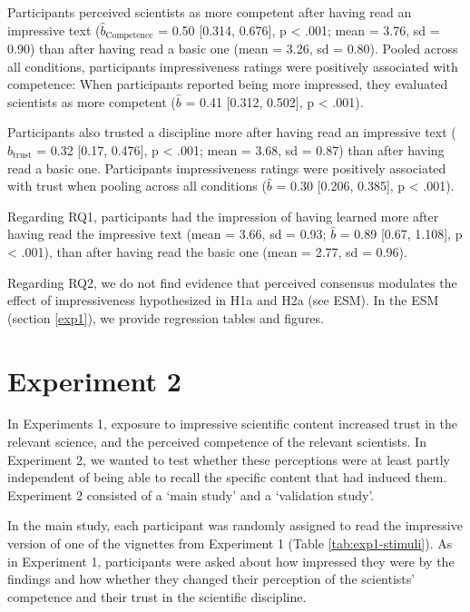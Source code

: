 \documentclass[
  doc,floatsintext]{apa6}
\begin{document}
Participants perceived scientists as more competent after having read an impressive text (\(\hat{b}_{\text{Competence}}\) = 0.50 {[}0.314, 0.676{]}, p \textless{} .001; mean = 3.76, sd = 0.90) than after having read a basic one (mean = 3.26, sd = 0.80). Pooled across all conditions, participants impressiveness ratings were positively associated with competence: When participants reported being more impressed, they evaluated scientists as more competent (\(\hat{b}\) = 0.41 {[}0.312, 0.502{]}, p \textless{} .001).

Participants also trusted a discipline more after having read an impressive text (\(\hat{b}_{\text{trust}}\) = 0.32 {[}0.17, 0.476{]}, p \textless{} .001; mean = 3.68, sd = 0.87) than after having read a basic one. Participants impressiveness ratings were positively associated with trust when pooling across all conditions (\(\hat{b}\) = 0.30 {[}0.206, 0.385{]}, p \textless{} .001).

Regarding RQ1, participants had the impression of having learned more after having read the impressive text (mean = 3.66, sd = 0.93; \(\hat{b}\) = 0.89 {[}0.67, 1.108{]}, p \textless{} .001), than after having read the basic one (mean = 2.77, sd = 0.96).

Regarding RQ2, we do not find evidence that perceived consensus modulates the effect of impressiveness hypothesized in H1a and H2a (see ESM). In the ESM (section \ref{exp1}), we provide regression tables and figures.

\section{Experiment 2}\label{experiment-2}

In Experiments 1, exposure to impressive scientific content increased trust in the relevant science, and the perceived competence of the relevant scientists. In Experiment 2, we wanted to test whether these perceptions were at least partly independent of being able to recall the specific content that had induced them. Experiment 2 consisted of a `main study' and a `validation study'.

In the main study, each participant was randomly assigned to read the impressive version of one of the vignettes from Experiment 1 (Table \ref{tab:exp1-stimuli}). As in Experiment 1, participants were asked about how impressed they were by the findings and how whether they changed their perception of the scientists' competence and their trust in the scientific discipline.
\end{document}
